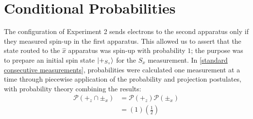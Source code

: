 
\section{Conditional Probabilities}
The configuration of Experiment 2 sends electrons to the second apparatus only if they measured spin-up in the first apparatus. This allowed us to assert that the state routed to the $\hat{x}$ apparatus was spin-up with probability $1$; the purpose was to prepare an initial spin state $\ket{+_{S_z}}$ for the $S_x$ measurement. In \autoref{standard consecutive measurements}, probabilities were calculated one measurement at a time through piecewise application of the probability and projection postulates, with probability theory combining the results:
\begin{align}
  \mathcal{P}(+_z \cap \pm_x) &= \mathcal{P}(+_z)\mathcal{P}(\pm_x) \\ \nonumber
  &= (1)\left(\frac{1}{2}\right)
\end{align}


